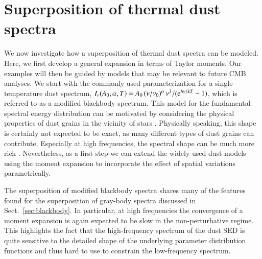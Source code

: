 \documentclass[usenatbib]{mn2e}
\begin{document}
\section{Superposition of thermal dust spectra}
\label{sec:dust}
We now investigate how a superposition of thermal dust spectra can be modeled. Here, we first develop a general expansion in terms of Taylor moments. Our examples will then be guided by models that may be relevant to future CMB analyses. 
%
We start with the commonly used parameterization for a single-temperature dust spectrum, $I_\nu(A_0, \alpha, T)=A_0\,(\nu/\nu_0)^\alpha\, \nu^3/({{\rm e}^{h\nu/kT}}-1)$, which is referred to as a modified blackbody spectrum. This model for the fundamental spectral energy distribution can be motivated by considering the physical properties of dust grains in the vicinity of stars \citep{Draine1998, Finkbeiner1999, Draine2003, Planck2013components}. Physically speaking, this shape is certainly not expected to be exact, as many different types of dust grains can contribute. Especially at high frequencies, the spectral shape can be much more rich \cite[e.g.,][]{Draine2003}. Nevertheless, as a first step we can extend the widely used dust models using the moment expansion to incorporate the effect of spatial variations parametrically. 

The superposition of modified blackbody spectra shares many of the features found for the superposition of gray-body spectra discussed in Sect.~\ref{sec:blackbody}. In particular, at high frequencies the convergence of a moment expansion is again expected to be slow in the non-perturbative regime. This highlights the fact that the high-frequency spectrum of the dust SED is quite sensitive to the detailed shape of the underlying parameter distribution functions and thus hard to use to constrain the low-frequency spectrum.  
\end{document}
